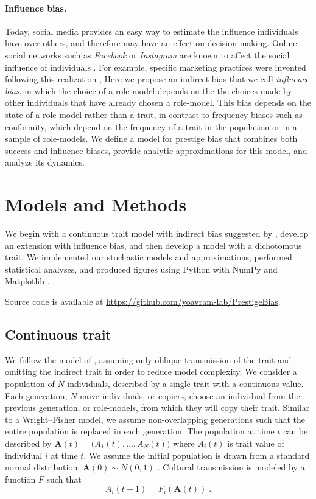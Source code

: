 \documentclass[12pt]{extarticle}
\let\vec\mathbf
\begin{document}
\paragraph{Influence bias.}
Today, social media provides an easy way to estimate the influence individuals have over others, and therefore may have an effect on decision making. Online social networks such as \textit{Facebook} or \textit{Instagram} are known to affect the social influence of individuals \citep{social_influence,influence_analysis,social_media}. For example, specific marketing practices were invented following this realization \citep{facebook_marketing},
Here we propose an indirect bias that we call \textit{influence bias}, in which the choice of a role-model depends on the the choices made by other individuals that have already chosen a role-model. 
This bias depends on the state of a role-model rather than a trait, in contrast to frequency biases such as conformity, which depend on the frequency of a trait in the population or in a sample of role-models. 
We define a model for prestige bias that combines both success and influence biases, provide analytic approximations for this model, and analyze its dynamics.
 
\section*{Models and Methods}

We begin with a continuous trait model with indirect bias suggested by \citet{evolutionBook}, develop an extension with influence bias, and then develop a model with a dichotomous trait.
We implemented our stochastic models and approximations, performed statistical analyses, and produced figures using Python \citep{python} with NumPy \citep{numpy} and Matplotlib \citep{mathplotlib}. 
 
Source code is available at \href{https://github.com/yoavram-lab/PrestigeBias}{https://github.com/yoavram-lab/PrestigeBias}.

\subsection*{Continuous trait}
We follow the model of \citet{evolutionBook}, assuming only oblique transmission of the trait and omitting the indirect trait in order to reduce model complexity. 
We consider a population of $N$ individuals, described by a single trait with a continuous value.
Each generation, $N$ naive individuals, or copiers, choose an individual from the previous generation, or role-models, from which they will copy their trait. Similar to a Wright–Fisher model, we assume non-overlapping generations such that the entire population is replaced in each generation.
The population at time $t$ can be described by $\vec{A}(t)=\big(A_{1}(t), \ldots, A_{N}(t)\big)$ where $A_{i}(t)$ is trait value of individual $i$ at time $t$. We assume the initial population is drawn from a standard normal distribution, $\vec{A}(0) \sim N(0,1)$ .
Cultural transmission is modeled by a function $F$ such that 
\begin{equation}\label{eq:transmission}
A_{i}(t+1) = F_i(\vec{A}(t)) \;.
\end{equation}
\end{document}
